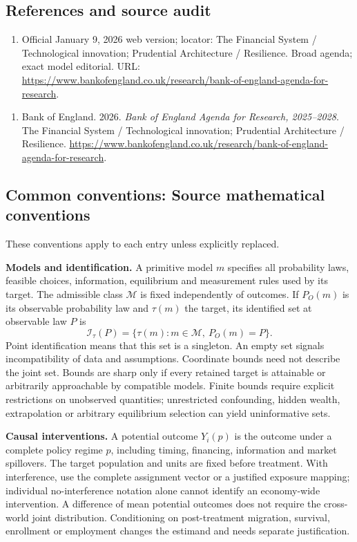 \documentclass[11pt,a4paper]{article}
\begin{document}
\subsection*{References and source audit}
\begin{enumerate}
\item Official January 9, 2026 web version; locator: The Financial System / Technological innovation; Prudential Architecture / Resilience. Broad agenda; exact model editorial. URL: \url{https://www.bankofengland.co.uk/research/bank-of-england-agenda-for-research}.
\end{enumerate}
\begin{enumerate}\raggedright
\item\hypertarget{definitions:source:30007601:1}{} Bank of England. 2026. \emph{Bank of England Agenda for Research, 2025–2028}. The Financial System / Technological innovation; Prudential Architecture / Resilience.
\url{https://www.bankofengland.co.uk/research/bank-of-england-agenda-for-research}.
\end{enumerate}

\subsection*{Common conventions: Source mathematical conventions}

These conventions apply to each entry unless explicitly replaced.

\textbf{Models and identification.} A primitive model \(m\) specifies all probability laws, feasible choices, information, equilibrium and measurement rules used by its target. The admissible class \(\mathcal M\) is fixed independently of outcomes. If \(P_O(m)\) is its observable probability law and \(\tau(m)\) the target, its identified set at observable law \(P\) is
\[
 \mathcal I_\tau(P)=\{\tau(m):m\in\mathcal M,\ P_O(m)=P\}.
\]
Point identification means that this set is a singleton. An empty set signals incompatibility of data and assumptions. Coordinate bounds need not describe the joint set. Bounds are sharp only if every retained target is attainable or arbitrarily approachable by compatible models. Finite bounds require explicit restrictions on unobserved quantities; unrestricted confounding, hidden wealth, extrapolation or arbitrary equilibrium selection can yield uninformative sets.

\textbf{Causal interventions.} A potential outcome \(Y_i(p)\) is the outcome under a complete policy regime \(p\), including timing, financing, information and market spillovers. The target population and units are fixed before treatment. With interference, use the complete assignment vector or a justified exposure mapping; individual no-interference notation alone cannot identify an economy-wide intervention. A difference of mean potential outcomes does not require the cross-world joint distribution. Conditioning on post-treatment migration, survival, enrollment or employment changes the estimand and needs separate justification.
\end{document}
